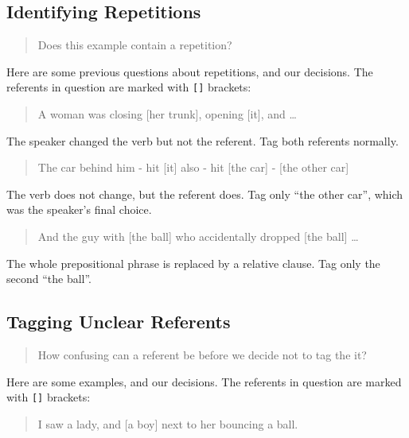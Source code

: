 \documentclass[
]{book}
\begin{document}
\hypertarget{identifying-repetitions}{%
\subsection{Identifying Repetitions}\label{identifying-repetitions}}

\begin{quote}
Does this example contain a repetition?
\end{quote}

Here are some previous questions about repetitions, and our decisions.
The referents in question are marked with \texttt{{[}{]}} brackets:

\begin{quote}
A woman was closing {[}her trunk{]}, opening {[}it{]}, and \ldots{}
\end{quote}

The speaker changed the verb but not the referent.
Tag both referents normally.

\begin{quote}
The car behind him - hit {[}it{]} also - hit {[}the car{]} - {[}the other car{]}
\end{quote}

The verb does not change, but the referent does.
Tag only ``the other car'', which was the speaker's final choice.

\begin{quote}
And the guy with {[}the ball{]} who accidentally dropped {[}the ball{]} \ldots{}
\end{quote}

The whole prepositional phrase is replaced by a relative clause.
Tag only the second ``the ball''.

\hypertarget{tagging-unclear-referents}{%
\subsection{Tagging Unclear Referents}\label{tagging-unclear-referents}}

\begin{quote}
How confusing can a referent be before we decide not to tag the it?
\end{quote}

Here are some examples, and our decisions.
The referents in question are marked with \texttt{{[}{]}} brackets:

\begin{quote}
I saw a lady, and {[}a boy{]} next to her bouncing a ball.
\end{quote}
\end{document}
